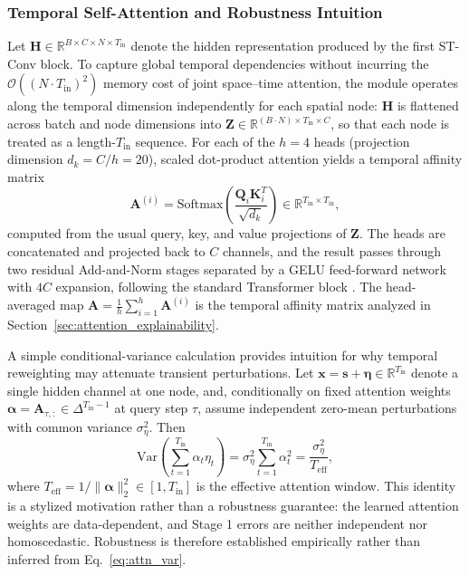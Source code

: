 \documentclass[preprint,12pt]{elsarticle}
\begin{document}
\subsubsection{Temporal Self-Attention and Robustness Intuition}

Let $\mathbf{H} \in \mathbb{R}^{B \times C \times N \times T_{\text{in}}}$ denote the hidden representation produced by the first ST-Conv block. To capture global temporal dependencies without incurring the $\mathcal{O}((N \cdot T_{\text{in}})^2)$ memory cost of joint space--time attention, the module operates along the temporal dimension independently for each spatial node: $\mathbf{H}$ is flattened across batch and node dimensions into $\mathbf{Z} \in \mathbb{R}^{(B \cdot N) \times T_{\text{in}} \times C}$, so that each node is treated as a length-$T_{\text{in}}$ sequence. For each of the $h=4$ heads (projection dimension $d_k = C/h = 20$), scaled dot-product attention yields a temporal affinity matrix
\begin{equation}
\mathbf{A}^{(i)} = \text{Softmax}\left(\frac{\mathbf{Q}_i \mathbf{K}_i^{T}}{\sqrt{d_k}}\right) \in \mathbb{R}^{T_{\text{in}} \times T_{\text{in}}},
\end{equation}
computed from the usual query, key, and value projections of $\mathbf{Z}$. The heads are concatenated and projected back to $C$ channels, and the result passes through two residual Add-and-Norm stages separated by a GELU feed-forward network with $4C$ expansion, following the standard Transformer block \citep{attention}. The head-averaged map $\mathbf{A} = \frac{1}{h}\sum_{i=1}^{h} \mathbf{A}^{(i)}$ is the temporal affinity matrix analyzed in Section~\ref{sec:attention_explainability}.

A simple conditional-variance calculation provides intuition for why temporal reweighting may attenuate transient perturbations. Let $\mathbf{x}=\mathbf{s}+\boldsymbol{\eta}\in\mathbb{R}^{T_{\text{in}}}$ denote a single hidden channel at one node, and, conditionally on fixed attention weights $\boldsymbol{\alpha} = \mathbf{A}_{\tau,:} \in \Delta^{T_{\text{in}}-1}$ at query step $\tau$, assume independent zero-mean perturbations with common variance $\sigma_{\eta}^{2}$. Then
\begin{equation}
\label{eq:attn_var}
\text{Var}\left(
\sum_{t=1}^{T_{\text{in}}}\alpha_t\eta_t
\right)
=
\sigma_{\eta}^{2}
\sum_{t=1}^{T_{\text{in}}}\alpha_t^2
=
\frac{\sigma_{\eta}^{2}}{T_{\text{eff}}},
\end{equation}
where $T_{\text{eff}}=1/\|\boldsymbol{\alpha}\|_2^2\in[1,T_{\text{in}}]$ is the effective attention window. This identity is a stylized motivation rather than a robustness guarantee: the learned attention weights are data-dependent, and Stage 1 errors are neither independent nor homoscedastic. Robustness is therefore established empirically rather than inferred from Eq.~\ref{eq:attn_var}.
\end{document}
